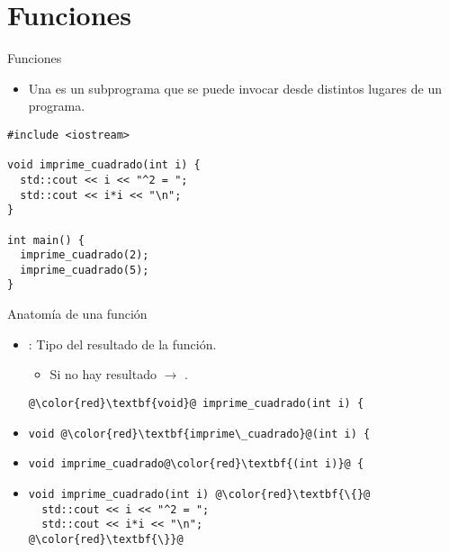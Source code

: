 \section{Funciones}

\begin{frame}[t,fragile]{Funciones}
\begin{itemize}
  \item Una  es un subprograma que se puede invocar
        desde distintos lugares de un programa.
\end{itemize}
\begin{lstlisting}
#include <iostream>

void imprime_cuadrado(int i) {
  std::cout << i << "^2 = ";
  std::cout << i*i << "\n";
}

int main() {
  imprime_cuadrado(2);
  imprime_cuadrado(5);
}
\end{lstlisting}
\end{frame}

\begin{frame}[t,fragile]{Anatomía de una función}
\begin{itemize}
  \item {}: Tipo del resultado de la función.
    \begin{itemize}
      \item Si no hay resultado $\rightarrow$ .
    \end{itemize}
\begin{lstlisting}[escapechar=@]
@\color{red}\textbf{void}@ imprime_cuadrado(int i) {
\end{lstlisting}

  \item {}
\begin{lstlisting}[escapechar=@]
void @\color{red}\textbf{imprime\_cuadrado}@(int i) {
\end{lstlisting}

  \item {}
\begin{lstlisting}[escapechar=@]
void imprime_cuadrado@\color{red}\textbf{(int i)}@ {
\end{lstlisting}

  \item {}
\begin{lstlisting}[escapechar=@]
void imprime_cuadrado(int i) @\color{red}\textbf{\{}@
  std::cout << i << "^2 = ";
  std::cout << i*i << "\n";
@\color{red}\textbf{\}}@
\end{lstlisting}
\end{itemize}
\end{frame}

